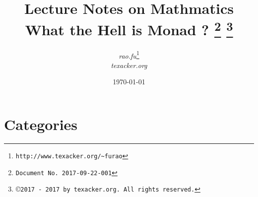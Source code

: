 \documentclass{article}
\begin{document}


\title{\textbf{Lecture Notes on Mathmatics} \\[1em] What the Hell is Monad ?
{\footnote{\texttt{Document No. 2017-09-22-001}}}
{\footnote{\copyright \texttt{2017 - 2017 by texacker.org. All rights reserved.}}}
}

\author{%
\small{\textit{rao.fu}}\thanks{\texttt{http://www.texacker.org/\~{}furao}} \\ \small{\textit{texacker.org}}
}
\date{\today}

\maketitle

\section{Categories}
\end{document}

